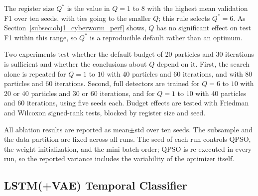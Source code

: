 \documentclass[conference]{IEEEtran}
\begin{document}
The register size $Q^{*}$ is the value in
$Q=1$ to $8$ with the highest mean validation F1 over ten seeds, with
ties going to the smaller $Q$; this rule selects $Q^{*}=6$. As Section~\ref{subsec:obj1_cyberworm_perf}
shows, $Q$ has no significant effect on test F1 within this range, so $Q^{*}$ is a
reproducible default rather than an optimum.

Two experiments test whether the default
budget of 20 particles and 30 iterations is sufficient and whether
the conclusions about $Q$ depend on it. First, the search alone is
repeated for $Q=1$ to $10$ with 40 particles and 60 iterations, and
with 80 particles and 60 iterations. Second, full detectors are
trained for $Q=6$ to $10$ with 20 or 40 particles and 30 or 60
iterations, and for $Q=1$ to $10$ with 40 particles and 60
iterations, using five seeds each. Budget effects are tested with
Friedman and Wilcoxon signed-rank tests, blocked by register size
and seed.

All ablation results are reported as
mean$\pm$std over ten seeds. The subsample and the data partition are
fixed across all runs. The seed of each run controls QPSO, the weight
initialization, and the mini-batch order; QPSO is re-executed in
every run, so the reported variance includes the variability of the
optimizer itself.

\subsection{LSTM(+VAE) Temporal Classifier}
\label{subsec:model_training}
\end{document}
